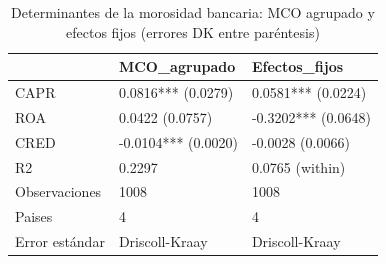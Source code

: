 \begin{table}[htbp]
\centering
\caption{Determinantes de la morosidad bancaria: MCO agrupado y efectos fijos (errores DK entre paréntesis)}
\begin{tabular}{lll}
\hline
 & MCO\_agrupado & Efectos\_fijos \\
\hline
CAPR & 0.0816*** (0.0279) & 0.0581*** (0.0224) \\
ROA & 0.0422 (0.0757) & -0.3202*** (0.0648) \\
CRED & -0.0104*** (0.0020) & -0.0028 (0.0066) \\
R2 & 0.2297 & 0.0765 (within) \\
Observaciones & 1008 & 1008 \\
Paises & 4 & 4 \\
Error estándar & Driscoll-Kraay & Driscoll-Kraay \\
\hline
\end{tabular}
\label{tab:tabla5_modelos}
\end{table}